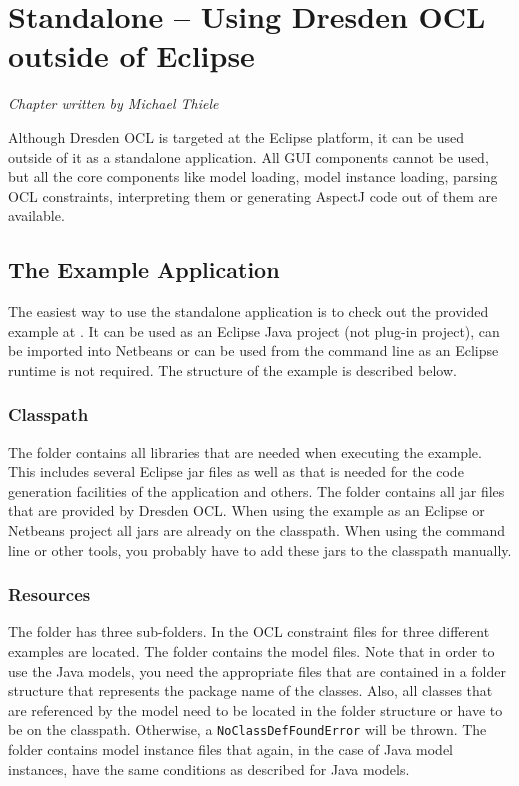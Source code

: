 \chapter{Standalone -- Using Dresden OCL outside of Eclipse}
\label{chapter:standalone}
\lstset{language=Java}

\begin{flushright}
\textit{Chapter written by Michael Thiele}
\end{flushright}

Although Dresden OCL is targeted at the Eclipse platform, it can be used
outside of it as a standalone application. All GUI components cannot be used,
but all the core components like model loading, model instance loading, parsing
OCL constraints, interpreting them or generating AspectJ code out of them are 
available.


\section{The Example Application}

The easiest way to use the standalone application is to check out the provided 
example at . It can be used
as an Eclipse Java project (not plug-in project), can be imported into Netbeans
or can be used from the command line as an Eclipse runtime is not required. The
structure of the example is described below.


\subsection{Classpath}

The  folder contains all libraries that are needed when
executing the example. This includes several Eclipse jar files as well as
 that is needed for the code generation facilities of
the application and others. The  folder contains all jar
files that are provided by Dresden OCL. When using the example as an Eclipse or
Netbeans project all jars are already on the classpath. When using the command
line or other tools, you probably have to add these jars to the classpath
manually.


\subsection{Resources}

The  folder has three sub-folders. In
 the OCL constraint files for three different examples
are located. The  folder contains the model files. Note that
in order to use the Java models, you need the appropriate  files
that are contained in a folder structure that represents the package name of
the classes. Also, all classes that are referenced by the model need to be
located in the folder structure or have to be on the classpath. Otherwise, a
\lstinline[breaklines=true]{NoClassDefFoundError} will be thrown. The
 folder contains model instance files that again, in
the case of Java model instances, have the same conditions as described for
Java models.


